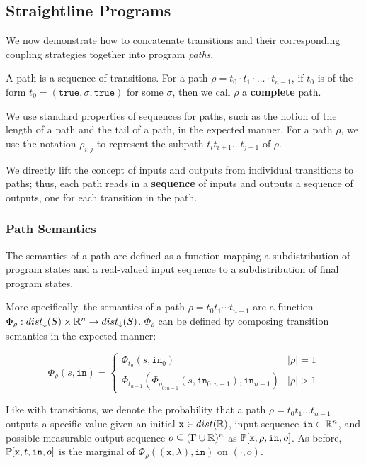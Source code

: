 
\subsection{Straightline Programs}

We now demonstrate how to concatenate transitions and their corresponding coupling strategies together into program \textit{paths}.

\begin{defn}[Paths]
    A path is a sequence of transitions. For a path $\rho = t_0\cdot t_1\cdot\ldots\cdot t_{n-1}$, if $t_0$ is of the form $t_0 = (\texttt{true}, \sigma, \texttt{true})$ for some $\sigma$, then we call $\rho$ a \textbf{complete} path.
\end{defn}

We use standard properties of sequences for paths, such as the notion of the length of a path and the tail of a path, in the expected manner. For a path $\rho$, we use the notation $\rho_{i:j}$ to represent the subpath  $t_i t_{i+1} \ldots t_{j-1}$ of $\rho$.

We directly lift the concept of inputs and outputs from individual transitions to paths; thus, each path reads in a \textbf{sequence} of inputs and outputs a sequence of outputs, one for each transition in the path. 

\subsubsection{Path Semantics}

The semantics of a path are defined as a function mapping a subdistribution of program states and a real-valued input sequence to a subdistribution of final program states. 

More specifically, the semantics of a path $\rho = t_0t_1\cdots t_{n-1}$ are a function $\Phi_\rho: dist_\downarrow(S)\times \mathbb{R}^n \to dist_\downarrow(S)$. $\Phi_\rho$ can be defined by composing transition semantics in the expected manner:

\[\Phi_\rho(s, \texttt{in}) = \begin{cases}
    \Phi_{t_0}(s, \texttt{in}_0)& |\rho| = 1\\
    \Phi_{t_{n-1}}(\Phi_{\rho_{0:n-1}}(s, \texttt{in}_{0:n-1}), \texttt{in}_{n-1})& |\rho| >1
\end{cases}\]


Like with transitions, we denote the probability that a path $\rho = t_0 t_1\ldots t_{n-1}$ outputs a specific value given an initial $\texttt{x}\in dist(\mathbb{R})$, input sequence $\texttt{in} \in \mathbb{R}^n$, and possible measurable output sequence $o \subseteq (\Gamma\cup\mathbb{R})^n$ as $\mathbb{P}[\texttt{x}, \rho, \texttt{in}, o]$. As before, $\mathbb{P}[\texttt{x}, t, \texttt{in}, o]$ is the marginal of $\Phi_\rho((\texttt{x}, \lambda), \texttt{in})$ on $(\cdot, o)$.

